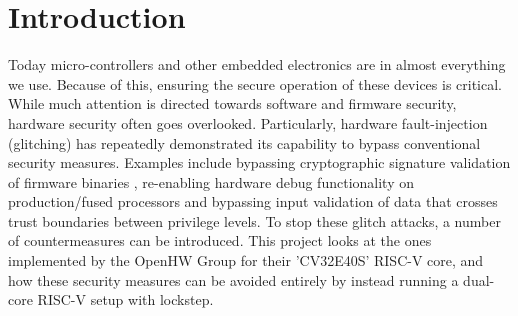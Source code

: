 \chapter{Introduction}
\label{intro} 

Today micro-controllers and other embedded electronics are in almost everything we use. Because of this, ensuring the secure operation of these devices is critical. While much attention is directed towards software and firmware security, hardware security often goes overlooked. Particularly, hardware fault-injection (glitching) has repeatedly demonstrated its capability to bypass conventional security measures. Examples include bypassing cryptographic signature validation of firmware binaries \cite{hole_in_soc}, re-enabling hardware debug functionality on production/fused processors\cite{reenable_debug} and bypassing input validation of data that crosses trust boundaries between privilege levels\cite{qualcom}. To stop these glitch attacks, a number of countermeasures can be introduced. This project looks at the ones implemented by the OpenHW Group for their 'CV32E40S' RISC-V core\cite{cv32e40s_manual}, and how these security measures can be avoided entirely by instead running a dual-core RISC-V setup with lockstep. 

